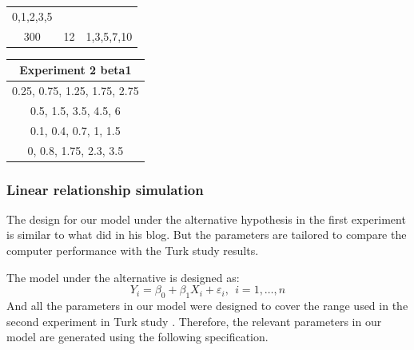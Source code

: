 \documentclass[12pt]{article}
\begin{document}
\begin{longtable}[]{@{}ccc@{}}
\begin{minipage}[t]{0.25\columnwidth}
0,1,2,3,5\strut
\end{minipage}\tabularnewline
\begin{minipage}[t]{0.23\columnwidth}\centering\strut
300\strut
\end{minipage} & \begin{minipage}[t]{0.23\columnwidth}\centering\strut
12\strut
\end{minipage} & \begin{minipage}[t]{0.25\columnwidth}\centering\strut
1,3,5,7,10\strut
\end{minipage}\tabularnewline
\bottomrule
\end{longtable}

\begin{longtable}[]{@{}c@{}}
\toprule
\begin{minipage}[b]{0.40\columnwidth}\centering\strut
Experiment 2 beta1\strut
\end{minipage}\tabularnewline
\midrule
\endhead
\begin{minipage}[t]{0.40\columnwidth}\centering\strut
0.25, 0.75, 1.25, 1.75, 2.75\strut
\end{minipage}\tabularnewline
\begin{minipage}[t]{0.40\columnwidth}\centering\strut
0.5, 1.5, 3.5, 4.5, 6\strut
\end{minipage}\tabularnewline
\begin{minipage}[t]{0.40\columnwidth}\centering\strut
0.1, 0.4, 0.7, 1, 1.5\strut
\end{minipage}\tabularnewline
\begin{minipage}[t]{0.40\columnwidth}\centering\strut
0, 0.8, 1.75, 2.3, 3.5\strut
\end{minipage}\tabularnewline
\bottomrule
\end{longtable}

\subsubsection{Linear relationship
simulation}\label{linear-relationship-simulation}

The design for our model under the alternative hypothesis in the first
experiment is similar to what \citet{SIM18} did in his blog. But the
parameters are tailored to compare the computer performance with the
Turk study results.

The model under the alternative is designed as:
\[Y_i = \beta_0 + \beta_1 X_{i}  + \varepsilon_i, ~~i=1, \dots , n\] And
all the parameters in our model were designed to cover the range used in
the second experiment in Turk study \citep{MM13}. Therefore, the
relevant parameters in our model are generated using the following
specification.
\end{document}
